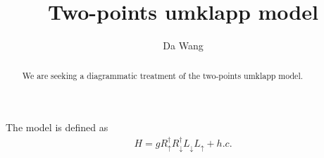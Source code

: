 \documentclass[12pt]{article}
\newcommand{\bea}{\begin{eqnarray}}
\newcommand{\eea}{\end{eqnarray}}
\begin{document}
\title{Two-points umklapp model}
\author{Da Wang}%
\date{}
\maketitle

\begin{abstract}
We are seeking a diagrammatic treatment of the two-points umklapp model.
\end{abstract}

The model is defined as
\bea H=gR_\uparrow^\dag R_\downarrow^\dag L_\downarrow L_\uparrow + h.c. \eea
\end{document}

